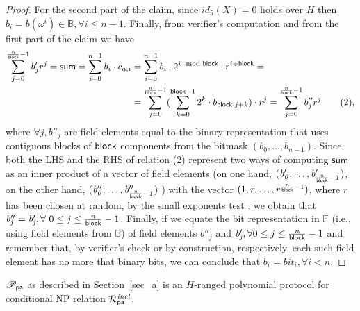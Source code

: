 \begin{proof}
\noindent For the second part of the claim, since $id_5(X) = 0$ holds over $H$ then 
$b_i = b(\omega^i) \in \mathbb{B}, \forall i \leq n-1$. Finally, from 
verifier's computation and from the first part of the claim we have 
\begin{align*}
\sum_{j=0}^{\frac{n}{\mathsf{block}}-1} b'_{j}r^j = \mathsf{sum} =  \sum_{i=0}^{n-1} b_i \cdot c_{a,i} & = \sum_{i=0}^{n-1} b_i \cdot 2^{i \mod {\mathsf{block}}} \cdot r^{i \div \mathsf{block}} = \\
&= \sum_{j=0}^{\frac{n}{\mathsf{block}} -1} (\sum_{k=0}^{\mathsf{block} -1} 2^k \cdot b_{\mathsf{block}\cdot j +k}) \cdot r^j = \sum_{j=0}^{\frac{n}{\mathsf{block}} -1} b''_{j}r^j \tag{2},
\end{align*}
where $\forall j, b''_{j}$ are field elements equal to the binary representation that uses contiguous blocks 
of $\mathsf{block}$ components from the bitmask $(\mathit{b}_0, \ldots, \mathit{b}_{n-1})$.
Since both the LHS and the RHS of relation (2) represent two ways of computing $\mathsf{sum}$ as an inner product of a vector 
of field elements (on one hand, $(\mathit{b'_{0}}, \ldots, \mathit{b'_{\frac{n}{\mathsf{block}}-1}})$, on the other hand, 
$(\mathit{b''_{0}}, \ldots, \mathit{b''_{\frac{n}{\mathsf{block}}-1}})$ ) with the vector $(1, r, \ldots, r^{\frac{n}{\mathsf{block}}-1})$, 
where $r$ has been chosen at random, by the small exponents test \cite{small_exponents}, we obtain that \ewnp 
$\mathit{b''_{j}} = \mathit{b'_{j}}, \\ \forall \ 0 \leq j\leq \frac{n}{\mathsf{block}}-1$. Finally, if we equate the bit representation in $\mathbb{F}$ 
(i.e., using field elements from $\mathbb{B}$) of field elements $\mathit{b''_{j}}$ and $\mathit{b'_{j}}, \forall 0\leq j\leq \frac{n}{\mathsf{block}}-1$ and remember that, 
by verifier's check or by construction, respectively, each such field element has no more that \block binary bits, we can conclude that \ewnp 
$b_i = \mathit{bit_i}, \forall i <n$.
\end{proof}

\begin{lemma} 
$\mathscr{P}_{\mathsf{pa}}$ as described in Section~\ref{sec_a} is an $H$-ranged polynomial protocol for conditional NP relation $\mathcal{R}^{\mathit{incl}}_{\mathsf{pa}}$.
\end{lemma}

